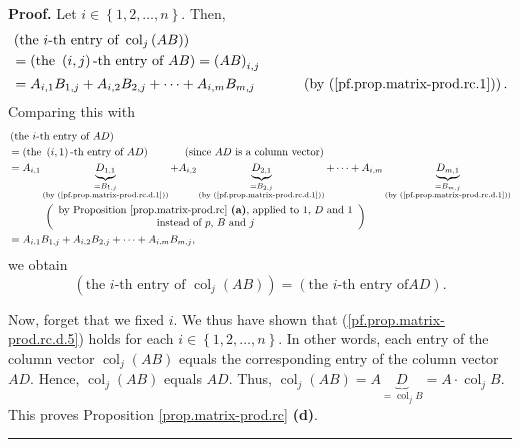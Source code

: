 \documentclass[numbers=enddot,12pt,final,onecolumn,notitlepage]{scrartcl}%
\theoremstyle{definition}
\newenvironment{proof}[1][Proof]{\noindent\textbf{#1.} }{\ \rule{0.5em}{0.5em}}
\begin{document}
\begin{proof}
Let $i\in\left\{  1,2,\ldots,n\right\}  $. Then,%
\begin{align*}
&  \left(  \text{the }i\text{-th entry of }\operatorname*{col}\nolimits_{j}%
\left(  AB\right)  \right) \\
&  =\left(  \text{the }\left(  i,j\right)  \text{-th entry of }AB\right)
=\left(  AB\right)  _{i,j}\\
&  =A_{i,1}B_{1,j}+A_{i,2}B_{2,j}+\cdots+A_{i,m}B_{m,j}%
\ \ \ \ \ \ \ \ \ \ \left(  \text{by (\ref{pf.prop.matrix-prod.rc.1})}\right)
.
\end{align*}
Comparing this with%
\begin{align*}
&  \left(  \text{the }i\text{-th entry of }AD\right) \\
&  =\left(  \text{the }\left(  i,1\right)  \text{-th entry of }AD\right)
\ \ \ \ \ \ \ \ \ \ \left(  \text{since }AD\text{ is a column vector}\right)
\\
&  =A_{i,1}\underbrace{D_{1,1}}_{\substack{=B_{1,j}\\\text{(by
(\ref{pf.prop.matrix-prod.rc.d.1}))}}}+A_{i,2}\underbrace{D_{2,1}%
}_{\substack{=B_{2,j}\\\text{(by (\ref{pf.prop.matrix-prod.rc.d.1}))}}%
}+\cdots+A_{i,m}\underbrace{D_{m,1}}_{\substack{=B_{m,j}\\\text{(by
(\ref{pf.prop.matrix-prod.rc.d.1}))}}}\\
&  \ \ \ \ \ \ \ \ \ \ \left(
\begin{array}
[c]{c}%
\text{by Proposition \ref{prop.matrix-prod.rc} \textbf{(a)}, applied to
}1\text{, }D\text{ and }1\\
\text{instead of }p\text{, }B\text{ and }j
\end{array}
\right) \\
&  =A_{i,1}B_{1,j}+A_{i,2}B_{2,j}+\cdots+A_{i,m}B_{m,j},
\end{align*}
we obtain%
\begin{equation}
\left(  \text{the }i\text{-th entry of }\operatorname*{col}\nolimits_{j}%
\left(  AB\right)  \right)  =\left(  \text{the }i\text{-th entry of
}AD\right)  . \label{pf.prop.matrix-prod.rc.d.5}%
\end{equation}


Now, forget that we fixed $i$. We thus have shown that
(\ref{pf.prop.matrix-prod.rc.d.5}) holds for each $i\in\left\{  1,2,\ldots
,n\right\}  $. In other words, each entry of the column vector
$\operatorname*{col}\nolimits_{j}\left(  AB\right)  $ equals the corresponding
entry of the column vector $AD$. Hence, $\operatorname*{col}\nolimits_{j}%
\left(  AB\right)  $ equals $AD$. Thus, $\operatorname*{col}\nolimits_{j}%
\left(  AB\right)  =A\underbrace{D}_{=\operatorname*{col}\nolimits_{j}%
B}=A\cdot\operatorname*{col}\nolimits_{j}B$. This proves Proposition
\ref{prop.matrix-prod.rc} \textbf{(d)}.
\end{proof}
\end{document}
